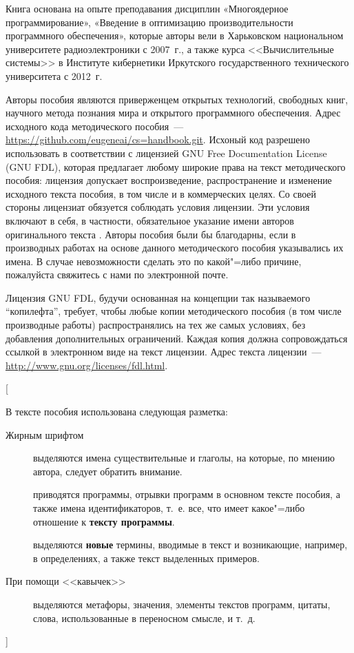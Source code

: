 \documentclass[14pt, a4paper, openany, twoside, final]{extbook} %
\newcommand{\e}[2][fcolor]{\textcolor{pcolor}{[}\textcolor{#1}{#2}\textcolor{pcolor}{]}}
\begin{document}
Книга основана на опыте преподавания дисциплин «Многоядерное программирование», «Введение в оптимизацию производительности программного обеспечения», которые авторы вели в Харьковском национальном университете радиоэлектроники с 2007~г., а также курса <<Вычислительные системы>> в Институте кибернетики Иркутского государственного технического университета с 2012~г.

Авторы пособия являются приверженцем открытых технологий, свободных книг, научного метода познания мира и открытого программного обеспечения.  Адрес исходного кода методического пособия~--- \url{https://github.com/eugeneai/cs=handbook.git}. Исхоный код разрешено использовать в соответствии с лицензией \foreignlanguage{english}{GNU Free Documentation License (GNU FDL)}, которая предлагает любому широкие права на текст методического пособия: лицензия допускает воспроизведение, распространение и изменение исходного текста пособия, в том числе и в коммерческих целях.  Со своей стороны лицензиат обязуется соблюдать условия лицензии.  Эти условия включают в себя, в частности, обязательное указание имени авторов оригинального текста \cite{GNUFDL}.  Авторы пособия были бы благодарны, если в производных работах на основе данного методического пособия указывались их имена.  В случае невозможности сделать это по какой"=либо причине, пожалуйста свяжитесь с нами по электронной почте.

Лицензия GNU FDL, будучи основанная на концепции так называемого ``копилефта'', требует, чтобы любые копии методического пособия (в том числе производные работы) распространялись на тех же самых условиях, без добавления дополнительных ограничений.  Каждая копия должна сопровождаться ссылкой в электронном виде на текст лицензии.  Адрес текста лицензии~--- \url{http://www.gnu.org/licenses/fdl.html}.

\e{
В тексте пособия использована следующая разметка:
\begin{description}
\item[Жирным шрифтом] выделяются имена существительные и глаголы, на которые, по мнению автора, следует обратить внимание.
\item[\normalfont{\tt Моноширинным шрифтом}] приводятся программы, отрывки программ в основном тексте пособия, а также имена идентификаторов, т.~е. все, что имеет какое"=либо отношение к {\bf тексту программы}.
\item[\normalfont{\em Наклонным шрифтом}] выделяются {\bf новые} термины, вводимые в текст и возникающие, например, в определениях, а также текст выделенных примеров.
\item[\normalfont При помощи <<кавычек>>] выделяются метафоры, значения, элементы текстов программ, цитаты, слова, использованные в переносном смысле, и т.~д.
\end{description}
}
\end{document}
